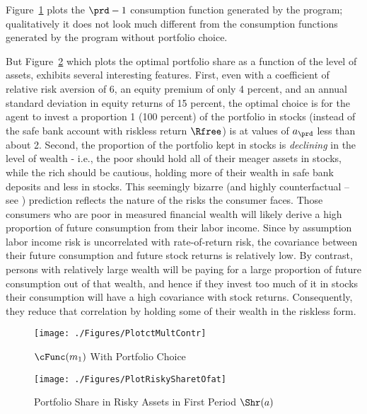 \documentclass[\econtexRoot/SolvingMicroDSOPs]{subfiles}
\begin{document}
Figure~\ref{fig:PlotctMultContr} plots the $\prd-1$ consumption function generated by the program; qualitatively it does not look much different from the consumption functions generated by the program without portfolio choice.

But Figure~\ref{fig:PlotRiskySharetOfat} which plots the optimal portfolio share as a function of the level of assets, exhibits several interesting features.  First, even with a coefficient of relative risk aversion of 6, an equity premium of only 4 percent, and an annual standard deviation in equity returns of 15 percent, the optimal choice is for the agent to invest a proportion 1 (100 percent) of the portfolio in stocks (instead of the safe bank account with riskless return $\Rfree$) is at values of ${a}_{\prd}$ less than about 2.  Second, the proportion of the portfolio kept in stocks is \textit{declining} in the level of wealth - i.e., the poor should hold all of their meager assets in stocks, while the rich should be cautious, holding more of their wealth in safe bank deposits and less in stocks.  This seemingly bizarre (and highly counterfactual -- see \cite{carroll:richportfolios}) prediction reflects the nature of the risks the consumer faces.  Those consumers who are poor in measured financial wealth will likely derive a high proportion of future consumption from their labor income.  Since by assumption labor income risk is uncorrelated with rate-of-return risk, the covariance between their future consumption and future stock returns is relatively low.  By contrast, persons with relatively large wealth will be paying for a large proportion of future consumption out of that wealth, and hence if they invest too much of it in stocks their consumption will have a high covariance with stock returns.  Consequently, they reduce that correlation by holding some of their wealth in the riskless form.

\hypertarget{PlotctMultContr}{}
\begin{figure}
  \texttt{[image: ./Figures/PlotctMultContr]}
  \caption{$\cFunc({m}_{1})$ With Portfolio Choice}
  \label{fig:PlotctMultContr}
\end{figure}

\hypertarget{PlotRiskySharetOfat}{}
\begin{figure}
  \texttt{[image: ./Figures/PlotRiskySharetOfat]}
  \caption{Portfolio Share in Risky Assets in First Period $\Shr({a})$}
  \label{fig:PlotRiskySharetOfat}
\end{figure}
\end{document}
